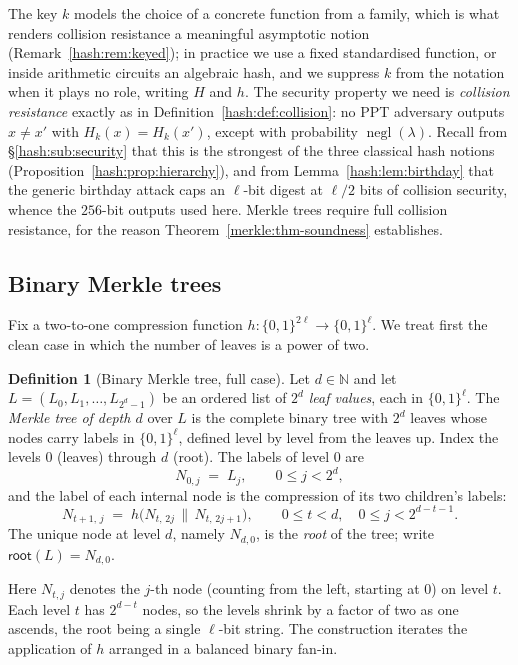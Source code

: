 \documentclass[11pt,a4paper]{article}
\theoremstyle{definition}
\newtheorem{definition}[theorem]{Definition}
\theoremstyle{remark}
\newcommand{\N}{\ensuremath{\mathbb{N}}}
\DeclareMathOperator{\negl}{negl}
\begin{document}
The key \(k\) models the choice of a concrete function from a family, which is what renders collision resistance a meaningful asymptotic notion (Remark~\ref{hash:rem:keyed}); in practice we use a fixed standardised function, or inside arithmetic circuits an algebraic hash, and we suppress \(k\) from the notation when it plays no role, writing \(H\) and \(h\). The security property we need is \emph{collision resistance} exactly as in Definition~\ref{hash:def:collision}: no PPT adversary outputs \(x \neq x'\) with \(H_k(x) = H_k(x')\), except with probability \(\negl(\lambda)\). Recall from \S\ref{hash:sub:security} that this is the strongest of the three classical hash notions (Proposition~\ref{hash:prop:hierarchy}), and from Lemma~\ref{hash:lem:birthday} that the generic birthday attack caps an \(\ell\)-bit digest at \(\ell/2\) bits of collision security, whence the \(256\)-bit outputs used here. Merkle trees require full collision resistance, for the reason Theorem~\ref{merkle:thm-soundness} establishes.

\subsection{Binary Merkle trees}\label{merkle:sec-tree}

Fix a two-to-one compression function \(h \colon \{0,1\}^{2\ell} \to \{0,1\}^{\ell}\). We treat first the clean case in which the number of leaves is a power of two.

\begin{definition}[Binary Merkle tree, full case]\label{merkle:def-tree}
Let \(d \in \N\) and let \(L = (L_0, L_1, \dots, L_{2^d - 1})\) be an ordered list of \(2^d\) \emph{leaf values}, each in \(\{0,1\}^\ell\). The \emph{Merkle tree of depth \(d\)} over \(L\) is the complete binary tree with \(2^d\) leaves whose nodes carry labels in \(\{0,1\}^\ell\), defined level by level from the leaves up. Index the levels \(0\) (leaves) through \(d\) (root). The labels of level \(0\) are
\[
N_{0,j} \;=\; L_j, \qquad 0 \le j < 2^{d},
\]
and the label of each internal node is the compression of its two children's labels:
\[
N_{t+1,\, j} \;=\; h\bigl(N_{t,\, 2j} \,\|\, N_{t,\, 2j+1}\bigr),
\qquad 0 \le t < d,\quad 0 \le j < 2^{d-t-1}.
\tag{$\ast$}\label{merkle:eq-recurrence}
\]
The unique node at level \(d\), namely \(N_{d,0}\), is the \emph{root} of the tree; write \(\mathsf{root}(L) = N_{d,0}\).
\end{definition}

Here \(N_{t,j}\) denotes the \(j\)-th node (counting from the left, starting at \(0\)) on level \(t\). Each level \(t\) has \(2^{d-t}\) nodes, so the levels shrink by a factor of two as one ascends, the root being a single \(\ell\)-bit string. The construction iterates the application of \(h\) arranged in a balanced binary fan-in.
\end{document}
